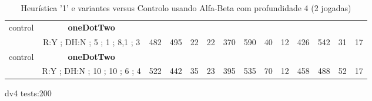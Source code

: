 \begin{table}[H]
{\begin{tabular}{|c|c|c|c|c|c|c|c|c|c|c|c|c|c|}
control & \cellcolor{blue!15}\textbf{oneDotTwo}& {\color[HTML]{00009B} } & {\color[HTML]{9A0000} } & {\color[HTML]{009901} } &  & {\color[HTML]{00009B} } & {\color[HTML]{9A0000} } & {\color[HTML]{009901} } &  & {\color[HTML]{00009B} } & {\color[HTML]{9A0000} } & {\color[HTML]{009901} } &  \\ 
 & \cellcolor{ blue!15}R:Y ; DH:N ; 5 ; 1 ; 8,1 ; 3 & \multirow{-2}{*}{{\color[HTML]{00009B} 482}} & \multirow{-2}{*}{{\color[HTML]{9A0000} 495}} & \multirow{-2}{*}{{\color[HTML]{009901} 22}} & \multirow{-2}{*}{22} & \multirow{-2}{*}{{\color[HTML]{00009B} 370}} & \multirow{-2}{*}{{\color[HTML]{9A0000} 590}} & \multirow{-2}{*}{{\color[HTML]{009901} 40}} & \multirow{-2}{*}{12} & \multirow{-2}{*}{{\color[HTML]{00009B} 426}} & \multirow{-2}{*}{{\color[HTML]{9A0000} 542}} & \multirow{-2}{*}{{\color[HTML]{009901} 31}} & \multirow{-2}{*}{17} \\ \hline

control & \cellcolor{blue!15}\textbf{oneDotTwo}& {\color[HTML]{00009B} } & {\color[HTML]{9A0000} } & {\color[HTML]{009901} } &  & {\color[HTML]{00009B} } & {\color[HTML]{9A0000} } & {\color[HTML]{009901} } &  & {\color[HTML]{00009B} } & {\color[HTML]{9A0000} } & {\color[HTML]{009901} } &  \\ 
 & \cellcolor{ blue!15}R:Y ; DH:N ; 10 ; 10 ; 6 ; 4 & \multirow{-2}{*}{{\color[HTML]{00009B} 522}} & \multirow{-2}{*}{{\color[HTML]{9A0000} 442}} & \multirow{-2}{*}{{\color[HTML]{009901} 35}} & \multirow{-2}{*}{23} & \multirow{-2}{*}{{\color[HTML]{00009B} 395}} & \multirow{-2}{*}{{\color[HTML]{9A0000} 535}} & \multirow{-2}{*}{{\color[HTML]{009901} 70}} & \multirow{-2}{*}{12} & \multirow{-2}{*}{{\color[HTML]{00009B} 458}} & \multirow{-2}{*}{{\color[HTML]{9A0000} 488}} & \multirow{-2}{*}{{\color[HTML]{009901} 52}} & \multirow{-2}{*}{17} \\ \hline
\end{tabular}} \caption{Heurística '1' e variantes versus Controlo usando Alfa-Beta com profundidade 4 (2 jogadas)} \label{onecontrol} \end{table}


dv4 tests:200


